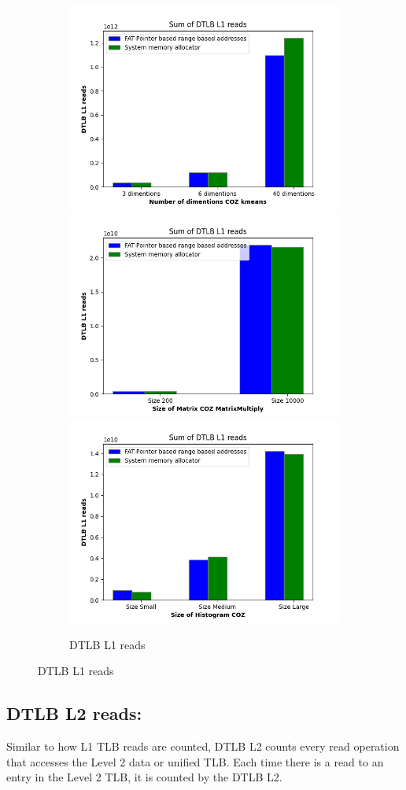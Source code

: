 \begin{figure}
  \begin{subfigure}{\linewidth}
  \includegraphics[width=.5\linewidth]{l1-tlb-kmeans.png}\hfill
  \includegraphics[width=.5\linewidth]{l1-tlb-matrixmultiply.png}\hfill
  \includegraphics[width=.5\linewidth]{l1-tlb-histogram.png}
  \caption{DTLB L1 reads}
\end{subfigure}
\end{figure}

\subsection{DTLB L2 reads:}
Similar to how L1 TLB reads are counted, DTLB L2 counts every read operation that accesses the 
Level 2 data or unified TLB. Each time there is a read to an entry in the Level 2 TLB, 
it is counted by the DTLB L2. 

